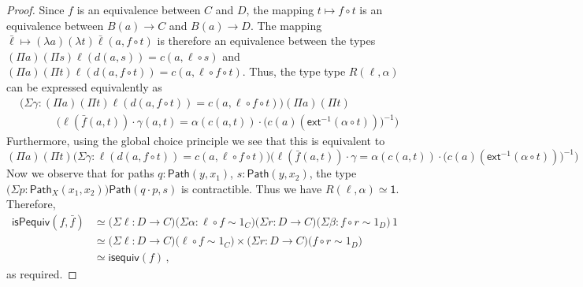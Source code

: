 \documentclass[10pt,a4paper,oneside,reqno]{amsart}
\numberwithin{equation}{section}
\theoremstyle{mythm}
\theoremstyle{mydef}
\theoremstyle{myrmk}
\newcommand{\co}{\colon}
\newcommand{\comp}{\circ}
\newcommand{\isequiv}{\mathsf{isequiv}}
\newcommand{\ext}{\mathsf{ext}}
\newcommand{\ct}{\cdot}
\newcommand{\Id}{\mathsf{Path}}
\newcommand{\one}{\mathsf{1}}
\begin{document}
\begin{proof}
Since $f$ is an equivalence between $C$ and $D$, the mapping $t \mapsto f \comp t$ is an equivalence between $B(a) \to C$ and $B(a) \to D$. The mapping $\bar{\ell} \mapsto (\lambda a) (\lambda t) \bar{\ell}(a,f \comp t)$ is therefore an equivalence between the types $(\Pi a) (\Pi s) \ell(d(a,s)) = c(a,\ell \comp s)$ and $(\Pi a) (\Pi t) \ell(d(a,f \comp t)) = c(a,\ell \comp f \comp t)$. Thus, the type type $R(\ell,\alpha)$ can be expressed equivalently as
\begin{align*}
& \big(\Sigma \gamma : (\Pi a) (\Pi t) \ell(d(a,f \circ t))=c(a,\ell \circ f \circ t)\big) (\Pi a) (\Pi t) \\ & \;\;\;\;\;\;\;\;\;\;\;\; \Big(\ell(\bar{f}(a,t)) \ct \gamma(a,t) = \alpha(c(a,t)) \ct \big(c(a)(\ext^{-1}(\alpha \circ t))\big)^{-1}\Big)
\end{align*}
Furthermore, using the global choice principle we see that this is equivalent to
\[ (\Pi a) (\Pi t) \big(\Sigma \gamma : \ell(d(a,f \circ t))=c(a,\ell \circ f \circ t)\big) \Big(\ell(\bar{f}(a,t)) \ct \gamma = \alpha(c(a,t)) \ct \big(c(a)(\ext^{-1}(\alpha \circ t))\big)^{-1}\Big) \]
Now we observe that for paths $q : \Id(y,x_1)$, $s : \Id(y,x_2)$, the type $\big(\Sigma p : \Id_X(x_1,x_2)\big) \Id(q \ct p,s)$ is contractible. Thus we have $R(\ell,\alpha) \simeq \one$. Therefore,
\begin{align*} 
\mathsf{isPequiv}(f,\bar{f}) 
  & \simeq   \big(\Sigma \ell \co D \to C \big) \big(\Sigma \alpha : \ell \comp f \sim 1_C \big) \big(\Sigma r  \co D \to C \big) 
 \big(\Sigma \beta \co f \comp r \sim 1_D \big) \, 1 \\
 & \simeq \big(\Sigma \ell \co D \to C \big)  \big( \ell \comp f \sim 1_C \big) \times 
 \big(\Sigma r  \co D \to C \big) \big( f \comp r \sim 1_D \big) \\
 & \simeq \isequiv(f) \, ,
\end{align*} 
as required.
\end{proof}
\end{document}
